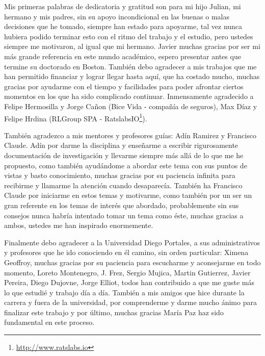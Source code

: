
Mis primeras palabras de dedicatoria  y gratitud son para mi hijo Julian, mi hermano y mis padres, sin su apoyo incondicional en las buenas o malas decisiones que he tomado, siempre han estado para apoyarme, tal vez nunca hubiera podido terminar esto con el ritmo del trabajo y el estudio, pero ustedes siempre me motivaron, al igual que mi hermano.  Javier muchas gracias por ser mi más grande referencia en este mundo académico, espero presentar antes que termine su doctorado en Boston. También debo agradecer a mis trabajos que me han permitido financiar y lograr llegar hasta aquí, que ha costado mucho, muchas gracias  por ayudarme con el tiempo y facilidades para poder afrontar ciertos momentos en los que ha sido complicado continuar. Inmensamente agradecido a  Felipe Hermosilla y Jorge Cañon (Bice Vida - compañía de seguros), Max Díaz y Felipe Hrdina (RLGroup SPA - RatslabsIO\footnote{\url{http://www.ratslabs.io}}).

También agradezco a mis mentores y profesores guías: Adín Ramirez y Francisco Claude. Adín por darme la disciplina y enseñarme a escribir rigurosamente documentación de investigación y llevarme siempre más allá de lo que me he propuesto, como también ayudándome a abordar este tema con sus puntos de vistas y basto conocimiento, muchas gracias por su paciencia infinita para recibirme y llamarme la atención cuando desaparecía. También ha Francisco Claude por iniciarme en estos temas y motivarme, como también por un ser un gran referente en los temas de interés que abordado, probablemente sin sus consejos nunca habría intentado tomar un tema como éste, muchas gracias a ambos, ustedes me han inspirado enormemente. 

Finalmente debo agradecer a la Universidad Diego Portales, a sus administrativos y profesores que he ido conociendo en él camino, sin orden particular: Ximena Geoffroy, muchas gracias por su paciencia para escucharme y aconsejarme en todo momento, Loreto Montenegro, J. Frez, Sergio Mujica, Martin Gutierrez, Javier Pereira, Diego Dujovne, Jorge Elliot, todos han contribuido a que me guste más lo que estudié y trabajo día a día. También a mis amigos que hice durante la carrera y fuera de la universidad, por comprenderme y darme mucho ánimo para finalizar este trabajo y por último, muchas gracias María Paz haz sido fundamental en este proceso.